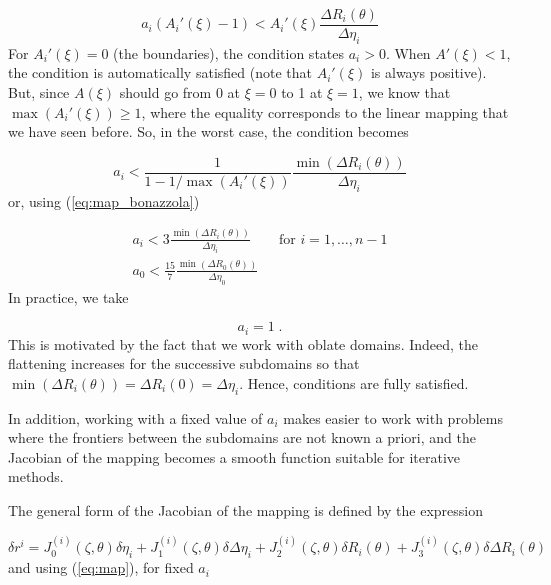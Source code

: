 \begin{equation}
a_i(A_i'(\xi)-1)<A_i'(\xi)\frac{\Delta R_i(\theta)}{\Delta\eta_i}
\end{equation}
For $A_i'(\xi)=0$ (the boundaries), the condition states $a_i>0$.
When $A'(\xi)<1$, the condition is automatically satisfied (note that
$A_i'(\xi)$ is always positive).  But, since $A(\xi)$ should go from 0 at
$\xi=0$ to 1 at $\xi=1$, we know that $\max(A_i'(\xi))\ge1$, where the
equality corresponds to the linear mapping that we have seen before. So,
in the worst case, the condition becomes

\begin{equation}
a_i<\frac{1}{1-1/\max(A_i'(\xi))}\frac{\min(\Delta R_i(\theta))}{\Delta\eta_i}
\end{equation}
or, using (\ref{eq:map_bonazzola})

\begin{equation}
\begin{array}{l}
\displaystyle a_i<3\frac{\min(\Delta R_i(\theta))}{\Delta\eta_i} \qquad \mbox{for $i=1,\ldots,n-1$}\\
\displaystyle a_0<\frac{15}{7}\frac{\min(\Delta R_0(\theta))}{\Delta\eta_0}
\end{array}
\label{cdtstab}
\end{equation}
In practice, we take

\begin{equation}
a_i=1\; .
\end{equation}
This is motivated by the fact that
we work with oblate domains. Indeed, the flattening increases for
the successive subdomains so that $\min(\Delta R_i(\theta))=\Delta
R_i(0)=\Delta\eta_i$. Hence, conditions  are fully satisfied.

In addition, working with a fixed value of $a_i$ makes easier to work
with problems where the frontiers between the subdomains are not known
a priori, and the Jacobian of the mapping becomes a smooth function
suitable for iterative methods.

The general form of the Jacobian of the mapping is defined by the expression

\begin{equation}
\delta r^{i}=J_0^{(i)}(\zeta,\theta)\delta\eta_i+
             J_1^{(i)}(\zeta,\theta)\delta\Delta\eta_i
            +J_2^{(i)}(\zeta,\theta)\delta R_i(\theta)
            +J_3^{(i)}(\zeta,\theta)\delta\Delta R_i(\theta)
\end{equation}
and using (\ref{eq:map}), for fixed $a_i$

